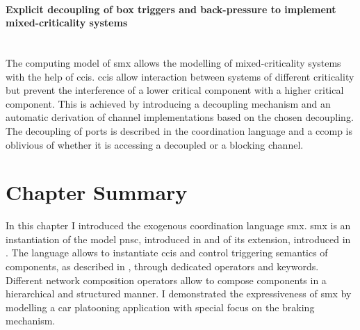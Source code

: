 \paragraph*{Explicit decoupling of box triggers and back-pressure to implement mixed-criticality systems} \hfill \\
The computing model of \gls*{smx} allows the modelling of mixed-criticality systems with the help of \glspl{cci}.
\Glspl{cci} allow interaction between systems of different criticality but prevent the interference of a lower critical component with a higher critical component.
This is achieved by introducing a decoupling mechanism and an automatic derivation of channel implementations based on the chosen decoupling.
The decoupling of ports is described in the coordination language and a \gls*{ccomp} is oblivious of whether it is accessing a decoupled or a blocking channel.

\section{Chapter Summary}
\label{sect_smx_summary}
In this chapter I introduced the exogenous coordination language \gls*{smx}.
\Gls*{smx} is an instantiation of the model \gls{pnsc}, introduced in \Chap{\ref{chap_ecm}} and of its extension, introduced in \Chap{\ref{chap_tcm}}.
The language allows to instantiate \glspl{cci} and control triggering semantics of components, as described in \Chap{\ref{chap_tcm}}, through dedicated operators and keywords.
Different network composition operators allow to compose components in a hierarchical and structured manner.
I demonstrated the expressiveness of \gls*{smx} by modelling a car platooning application with special focus on the braking mechanism.
